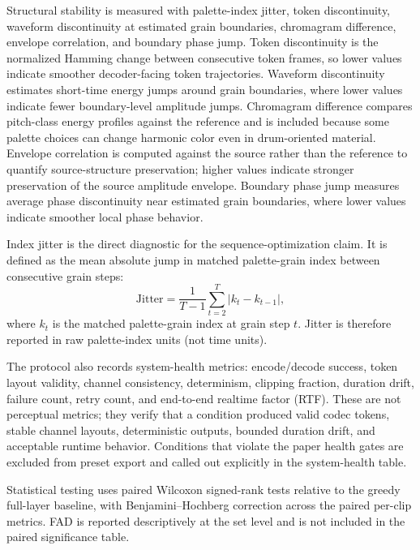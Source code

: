 \documentclass[twoside,a4paper]{article}
\begin{document}
Structural stability is measured with palette-index jitter, token discontinuity, waveform discontinuity at estimated grain boundaries, chromagram difference, envelope correlation, and boundary phase jump. Token discontinuity is the normalized Hamming change between consecutive token frames, so lower values indicate smoother decoder-facing token trajectories. Waveform discontinuity estimates short-time energy jumps around grain boundaries, where lower values indicate fewer boundary-level amplitude jumps. Chromagram difference compares pitch-class energy profiles against the reference and is included because some palette choices can change harmonic color even in drum-oriented material. Envelope correlation is computed against the source rather than the reference to quantify source-structure preservation; higher values indicate stronger preservation of the source amplitude envelope. Boundary phase jump measures average phase discontinuity near estimated grain boundaries, where lower values indicate smoother local phase behavior.

Index jitter is the direct diagnostic for the sequence-optimization claim. It is defined as the mean absolute jump in matched palette-grain index between consecutive grain steps:
\begin{equation}
\mathrm{Jitter} = \frac{1}{T-1}\sum_{t=2}^{T} \left|k_t-k_{t-1}\right|,
\end{equation}
where $k_t$ is the matched palette-grain index at grain step $t$. Jitter is therefore reported in raw palette-index units (not time units).

The protocol also records system-health metrics: encode/decode success, token layout validity, channel consistency, determinism, clipping fraction, duration drift, failure count, retry count, and end-to-end realtime factor (RTF). These are not perceptual metrics; they verify that a condition produced valid codec tokens, stable channel layouts, deterministic outputs, bounded duration drift, and acceptable runtime behavior. Conditions that violate the paper health gates are excluded from preset export and called out explicitly in the system-health table.

Statistical testing uses paired Wilcoxon signed-rank tests \cite{Wilcoxon:1945:IndividualComparisons} relative to the greedy full-layer baseline, with Benjamini--Hochberg correction \cite{Benjamini:1995:FDR} across the paired per-clip metrics. FAD is reported descriptively at the set level and is not included in the paired significance table.
\end{document}
